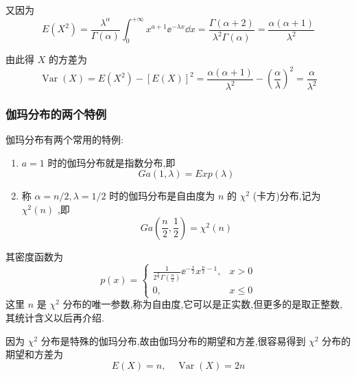 又因为
\[
E\left(X^{2}\right)=\frac{\lambda^{\alpha}}{\Gamma(\alpha)} \int_{0}^{+\infty} x^{a+1} \ee ^{-\lambda x} \dd x=\frac{\Gamma(\alpha+2)}{\lambda^{2} \Gamma(\alpha)}=\frac{\alpha(\alpha+1)}{\lambda^{2}}
\]

由此得 $ X $ 的方差为
\[
\operatorname{Var}(X)=E\left(X^{2}\right)-[E(X)]^{2}=\frac{\alpha(\alpha+1)}{\lambda^{2}}-\left(\frac{\alpha}{\lambda}\right)^{2}=\frac{\alpha}{\lambda^{2}}
\]

\subsubsection{伽玛分布的两个特例}

伽玛分布有两个常用的特例:

\begin{enumerate}
	\item $ a=1 $ 时的伽玛分布就是指数分布,即
	\begin{equation}
	G a(1, \lambda)=E x p(\lambda) \label{eq:2.5.13}
	\end{equation}
	\item 称 $ \alpha=n / 2, \lambda=1 / 2 $ 时的伽玛分布是自由度为 $ n $ 的 $ \chi^{2} $ (卡方)分布,记为 $ \chi^{2}(n) $ ,即
	\begin{equation}
	G a\left(\frac{n}{2}, \frac{1}{2}\right)=\chi^{2}(n) \label{eq:2.5.14}
	\end{equation}
\end{enumerate}

其密度函数为
\begin{equation}
p(x)=\left\{
\begin{array}{ll}
{\frac{1}{2^{\frac{\pi}{2}} \Gamma\left(\frac{n}{2}\right)} \ee ^{-\frac{x}{2}} x^{\frac{n}{2}-1},} & {x>0} \\ 
{0,} & {x \leqslant 0}
\end{array}
\right. \label{eq:2.5.15}
\end{equation}
这里 $ n $ 是 $ \chi^{2} $ 分布的唯一参数,称为自由度,它可以是正实数,但更多的是取正整数,其统计含义以后再介绍.

因为 $ \chi^{2} $ 分布是特殊的伽玛分布,故由伽玛分布的期望和方差,很容易得到 $ \chi^{2} $ 分布的期望和方差为
\[
E(X)=n, \quad \operatorname{Var}(X)=2 n
\]

